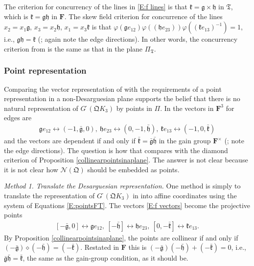 \documentclass[reqno,12pt]{amsart}
\theoremstyle{remark}
\numberwithin{equation}{section}
\numberwithin{figure}{section}
\renewcommand \phi{\varphi}
\newcommand \inv{^{-1}}
\newcommand \full{^{{}^{{}_{{}_\bullet}}\!}}
\newcommand \cN{\mathcal{N}}
\newcommand\fF{\mathbf{F}}	%
\newcommand \fQ{\mathfrak Q}
\newcommand \fT{\mathfrak T}
\newcommand\Qg{\mathfrak g}
\newcommand\Qh{\mathfrak h}
\newcommand\Qk{\mathfrak k}
\newcommand\Tg{\bar{\mathfrak g}}
\newcommand\Th{\bar{\mathfrak h}}
\newcommand\Tk{\bar{\mathfrak k}}
\newcommand\PP{\Pi}	%
\newcommand\G{{G\full}}
\begin{document}
The criterion for concurrency of the lines in \eqref{E:f lines} is that $\Qk = \Qg\times\Qh$ in $\fT$, which is $\Qk = \Qg\Qh$ in $\fF$.  
The skew field criterion for concurrence of the lines $x_2 = x_1 \Qg$, $x_3=x_2 \Qh$, $x_1=x_3 \Qk$ is that $\phi(\Qg e_{12})\phi((\Qh e_{23}))\phi((\Qk e_{13})\inv) = 1$, i.e., $\Qg\Qh=\Qk$ (\cite[Corollary IV.2.2]{BG}; again note the edge directions).  
In other words, the concurrency criterion from \cite[Part IV]{BG} is the same as that in the plane $\PP_\fT$.

\subsubsection{Point representation}\label{q f point}

Comparing the vector representation of \cite[Section IV.2.1]{BG} with the requirements of a point representation in a non-Desarguesian plane supports the belief that there is no natural representation of $\G(\fQ K_3)$ by points in $\PP$.
In \cite[Section IV.2.1]{BG} the vectors in $\fF^3$ for edges are
%
\begin{align}\label{E:f vectors}
\Qg e_{12} \leftrightarrow (-1,\Tg,0), \ 
\Qh e_{23} \leftrightarrow (0,-1,\Th), \ 
\Qk e_{13} \leftrightarrow (-1,0,\Tk)
\end{align}
%
and the vectors are dependent if and only if $\Tk = \Tg\Th$ in the gain group $\fF^\times$ (\cite[Theorem IV.2.1]{BG}; note the edge directions).    The question is how that compares with the diamond criterion of Proposition \ref{collinearpointsinaplane}.  The answer is not clear because it is not clear how $\cN(\fQ)$ should be embedded as points.

\medskip
\emph{Method 1.  Translate the Desarguesian representation.}
One method is simply to translate the representation of $\G(\fQ K_3)$ in \cite[Section IV.2.1]{BG} into affine coordinates using the system of Equations \eqref{E:pointsFT}.  The vectors \eqref{E:f vectors} become the projective points 
%
\begin{align}\label{E:f negpoints}
[-\Tg,0] \leftrightarrow \Qg e_{12},\ 
[-\Th] \leftrightarrow \Qh e_{23},\ 
[0,-\Tk] \leftrightarrow \Qk e_{13}.
\end{align}
%
By Proposition \ref{collinearpointsinaplane}, the points are collinear if and only if $(-\Tg)\diamond(-\Th)=(-\Tk)$.  Restated in $\fF$ this is $(-\Tg)(-\Th)+(-\Tk)=0$, i.e., $\Tg\Th=\Tk$, the same as the gain-group condition, as it should be.  
\end{document}
